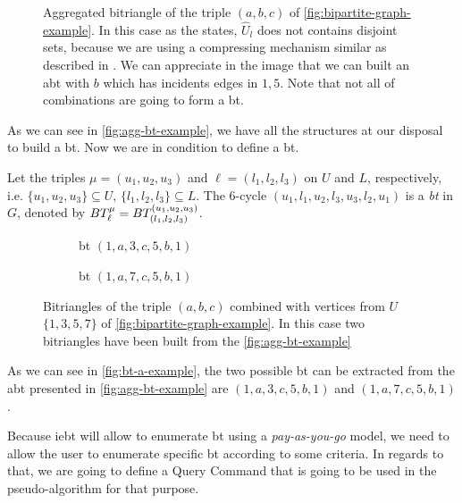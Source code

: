 \begin{figure}[h!]
\centering      
{}
\caption[{[\acrshort{iebt}] Example Aggregated bitriangle}]{Aggregated bitriangle of the triple $(a,b,c)$ of \autoref{fig:bipartite-graph-example}. In this case as the  states, $\hat{U}_l$ does not contains disjoint sets, because we are using a compressing mechanism similar as described in \cite{Lai}. We can appreciate in the image that we can built an \acrshort{abt} with $b$ which has incidents edges in $1,5$. Note that not all of combinations are going to form a \acrshort{bt}.}
\label{fig:agg-bt-example}
\end{figure}
      
As we can see in \autoref{fig:agg-bt-example}, we have all the structures at our disposal to build a \acrshort{bt}. Now we are in condition to define a \acrshort{bt}.

\begin{definition}[\acrlong{bt}]\label{def:bt}
Let the triples $\mu=(u_1, u_2, u_3)$ and $\ell=(l_1, l_2,l_3)$ on $U$ and $L$, respectively, i.e.  $\{u_1, u_2, u_3\} \subseteq U$, $\{l_1, l_2,l_3\} \subseteq L$. 
The 6-cycle $(u_1,l_1,u_2,l_3,u_3,l_2,u_1)$  is a \textit{\acrfull{bt}} in $G$, denoted by $BT_{\ell}^{\mu} = BT_{(l_1, l_2,l_3)}^{(u_1, u_2, u_3)}$. 
\end{definition}      

\begin{figure}[h!]
\begin{subfigure}[b]{0.5\textwidth}
\centering
{}
\caption{\acrshort{bt} $(1,a,3,c,5,b,1)$}
\end{subfigure}
\begin{subfigure}[b]{0.5\textwidth}
\centering
{}
\caption{\acrshort{bt} $(1,a,7,c,5,b,1)$}
\end{subfigure}
\caption[{[\acrshort{iebt}] Example of bitriangles}]{Bitriangles of the triple $(a,b,c)$ combined with vertices from $U$ $\{1,3,5,7\}$ of \autoref{fig:bipartite-graph-example}. In this case two bitriangles have been built from the \autoref{fig:agg-bt-example}}
\label{fig:bt-a-example}
\end{figure}

As we can see in \autoref{fig:bt-a-example}, the two possible \acrshort{bt} can be extracted from the \acrshort{abt} presented in \autoref{fig:agg-bt-example} are $(1,a,3,c,5,b,1)$ and $(1,a,7,c,5,b,1)$.

Because \acrshort{iebt} will allow to enumerate \acrshort{bt} using a \emph{pay-as-you-go} model, we need to allow the user to enumerate specific \acrshort{bt} according to some criteria.
In regards to that, we are going to define a Query Command that is going to be used in the pseudo-algorithm for that purpose.

